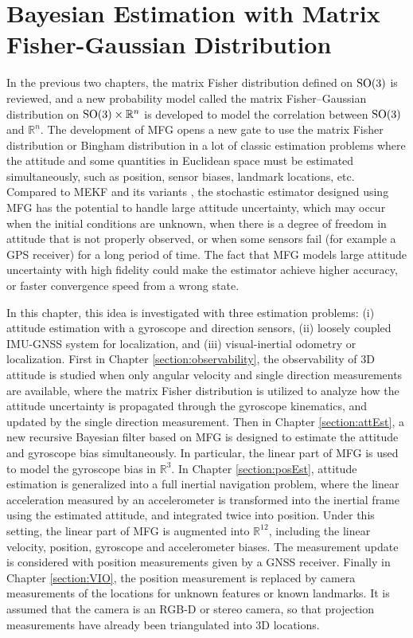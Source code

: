 
\chapter{Bayesian Estimation with Matrix Fisher-Gaussian Distribution} \label{chap:estimation}

In the previous two chapters, the matrix Fisher distribution defined on $\mathrm{SO}(3)$ is reviewed, and a new probability model called the matrix Fisher--Gaussian distribution on $\mathrm{SO}(3)\times \mathbb{R}^n$ is developed to model the correlation between $\mathrm{SO}(3)$ and $\mathbb{R}^n$.
The development of MFG opens a new gate to use the matrix Fisher distribution or Bingham distribution in a lot of classic estimation problems where the attitude and some quantities in Euclidean space must be estimated simultaneously, such as position, sensor biases, landmark locations, etc.
Compared to MEKF and its variants \cite{mourikis2007multi,sola2017quaternion}, the stochastic estimator designed using MFG has the potential to handle large attitude uncertainty, which may occur when the initial conditions are unknown, when there is a degree of freedom in attitude that is not properly observed, or when some sensors fail (for example a GPS receiver) for a long period of time.
The fact that MFG models large attitude uncertainty with high fidelity could make the estimator achieve higher accuracy, or faster convergence speed from a wrong state.

In this chapter, this idea is investigated with three estimation problems: (i) attitude estimation with a gyroscope and direction sensors, (ii) loosely coupled IMU-GNSS system for localization, and (iii) visual-inertial odometry or localization.
First in Chapter \ref{section:observability}, the observability of 3D attitude is studied when only angular velocity and single direction measurements are available, where the matrix Fisher distribution is utilized to analyze how the attitude uncertainty is propagated through the gyroscope kinematics, and updated by the single direction measurement.
Then in Chapter \ref{section:attEst}, a new recursive Bayesian filter based on MFG is designed to estimate the attitude and gyroscope bias simultaneously.
In particular, the linear part of MFG is used to model the gyroscope bias in $\mathbb{R}^3$.
In Chapter \ref{section:posEst}, attitude estimation is generalized into a full inertial navigation problem, where the linear acceleration measured by an accelerometer is transformed into the inertial frame using the estimated attitude, and integrated twice into position.
Under this setting, the linear part of MFG is augmented into $\mathbb{R}^{12}$, including the linear velocity, position, gyroscope and accelerometer biases.
The measurement update is considered with position measurements given by a GNSS receiver.
Finally in Chapter \ref{section:VIO}, the position measurement is replaced by camera measurements of the locations for unknown features or known landmarks.
It is assumed that the camera is an RGB-D or stereo camera, so that projection measurements have already been triangulated into 3D locations.

